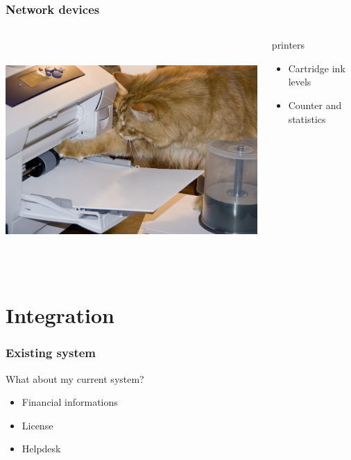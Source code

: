 \documentclass{beamer}
\begin{document}
\begin{frame}

    \frametitle{Network devices}


 \begin{columns}
 \begin{column}{0.15\textwidth}
         \includegraphics[height=8.5cm]{./pics/printer.jpg}
 \end{column}
 \begin{column}{1.25\textwidth}
    

    \begin{block}{printers}
        \begin{itemize}
            \item Cartridge ink levels
            \item Counter and statistics
        \end{itemize}
    \end{block}

 \end{column}
\end{columns}
\end{frame}



\section{Integration}

\begin{frame}

    \frametitle{Existing system}

 
    \begin{block}{What about my current system?}
        \begin{itemize}
            \item Financial informations
            \item License
            \item Helpdesk
        \end{itemize}
    \end{block}
   

\end{frame}
\end{document}
